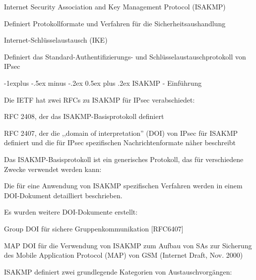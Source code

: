 \documentclass[a4paper]{article}
\makeatletter
\renewcommand{\subsection}{\@startsection{subsection}{2}{0mm}%
 {-1explus -.5ex minus -.2ex}%
 {0.5ex plus .2ex}%
 {\normalfont\normalsize\bfseries}}
\makeatother
\begin{document}
\begin{multicols}{3}
\begin{itemize*}
            \begin{itemize*}
                  \item Internet Security Association and Key Management Protocol (ISAKMP)
                  \begin{itemize*} \item Definiert Protokollformate und Verfahren für die Sicherheitsaushandlung \end{itemize*}
                  \item Internet-Schlüsselaustausch (IKE)
                  \begin{itemize*} \item Definiert das Standard-Authentifizierungs- und Schlüsselaustauschprotokoll von IPsec \end{itemize*}
            \end{itemize*}
      \end{itemize*}


      \subsection{ISAKMP - Einführung}

      \begin{itemize*}
            \item
            Die IETF hat zwei RFCs zu ISAKMP für IPsec verabschiedet:

            \begin{itemize*}
                  \item RFC 2408, der das ISAKMP-Basisprotokoll definiert
                  \item RFC 2407, der die ,,domain of interpretation'' (DOI) von IPsec für ISAKMP definiert und die für IPsec spezifischen Nachrichtenformate näher beschreibt
            \end{itemize*}
            \item
            Das ISAKMP-Basisprotokoll ist ein generisches Protokoll, das für
            verschiedene Zwecke verwendet werden kann:

            \begin{itemize*}
                  \item Die für eine Anwendung von ISAKMP spezifischen Verfahren werden in einem DOI-Dokument detailliert beschrieben.
                  \item Es wurden weitere DOI-Dokumente erstellt:
                  \begin{itemize*} \item Group DOI für sichere Gruppenkommunikation {[}RFC6407{]} \item MAP DOI für die Verwendung von ISAKMP zum Aufbau von SAs zur Sicherung des Mobile Application Protocol (MAP) von GSM (Internet Draft, Nov. 2000) \end{itemize*}
            \end{itemize*}
            \item
            ISAKMP definiert zwei grundlegende Kategorien von Austauschvorgängen:


\end{itemize*}
\end{multicols}
\end{document}
